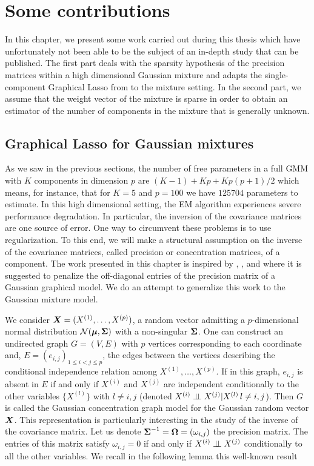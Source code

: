 
\chapter{Some contributions}\label{chap:contributions}
In this chapter, we present some work carried out during this thesis which have unfortunately not been able to be the subject of an in-depth study that can be published. The first part deals with the sparsity hypothesis of the precision matrices within a high dimensional Gaussian mixture and adapts the single-component Graphical Lasso from \citep{glasso07} to the mixture setting. In the second part, we assume that the weight vector of the mixture is sparse in order to obtain an estimator of the number of components in the mixture that is generally unknown. 

\section{Graphical Lasso for Gaussian mixtures}\label{chapgraphlasso}
As we saw in the previous sections, the number of free parameters in a full GMM with $K$ components in dimension $p$ are $(K-1)+Kp+Kp(p+1)/2$ which means, for instance, that for $K=5$ and $p=100$ we have $125704$ parameters to estimate. In this high dimensional setting, the EM algorithm experiences severe performance degradation. In particular, the inversion of the covariance matrices are one source of error. One way to circumvent these problems is to use regularization. To this end, we will make a structural assumption on the inverse of the covariance matrices, called precision or concentration matrices, of a component. The work presented in this chapter is inspired by \citep{glasso07}, \citep{banerjee}, \citep{yuanLin_graph} and \citep{meinshausen2006} where it is suggested to penalize the off-diagonal entries of the precision matrix of a Gaussian graphical model. We do an attempt to generalize this work to the Gaussian mixture model.

We consider $\boldsymbol X=(X^{(1)},\dots,X^{(p)})$, a random vector admitting a $p$-dimensional normal distribution $\mathcal N(\boldsymbol\mu, \boldsymbol\Sigma)$ with a non-singular $\boldsymbol\Sigma$. One can construct an undirected graph $G=(V,E)$ with $p$ vertices corresponding to each coordinate and, $E=(e_{i,j})_{1\leq i < j \leq p}$, the edges between the vertices describing the conditional independence relation among $X^{(1)},\dots,X^{(p)}$. If in this graph, $e_{i,j}$ is absent in $E$ if and only if $X^{(i)}$ and $X^{(j)}$ are independent conditionally to the other variables $\{X^{(l)}\}$ with $l\neq i,j$ (denoted $X^{(i)} \perp\!\!\!\perp X^{(j)}|X^{(l)}\, l\neq i,j$). Then $G$ is called the Gaussian concentration graph model for the Gaussian random vector $\boldsymbol X$. 
This representation is particularly interesting in the study of the inverse of the covariance matrix. Let us denote $\boldsymbol\Sigma^{-1}=\boldsymbol\Omega=(\omega_{i,j})$ the precision matrix. The entries of this matrix satisfy $\omega_{i,j}=0$ if and only if $X^{(i)} \perp\!\!\!\perp X^{(j)}$ conditionally to all the other variables. We recall in the following lemma this well-known result

